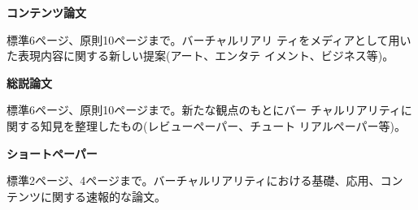 \documentclass[a4paper,twoside]{jarticle}
\begin{document}
\noindent
{\bf コンテンツ論文}

標準6ページ、原則10ページまで。バーチャルリアリ
ティをメディアとして用いた表現内容に関する新しい提案(アート、エンタテ
イメント、ビジネス等)。

\noindent
{\bf 総説論文}

標準6ページ、原則10ページまで。新たな観点のもとにバー
チャルリアリティに関する知見を整理したもの(レビューペーパー、チュート
リアルペーパー等)。

\noindent
{\bf ショートペーパー}

標準2ページ、4ページまで。バーチャルリアリティにおける基礎、応用、コン
テンツに関する速報的な論文。


\begin{biography}

\end{biography}
\end{document}
